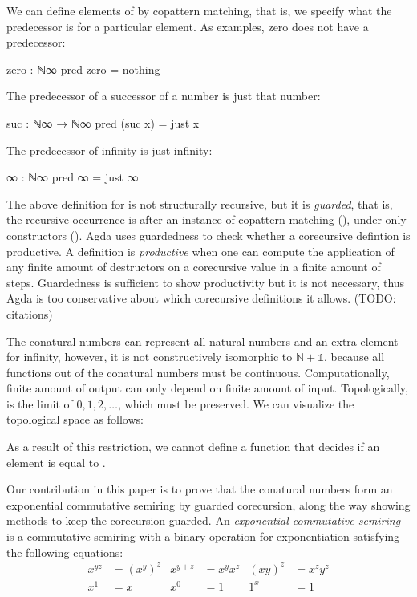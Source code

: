 We can define elements of  by copattern matching, that is, we
specify what the predecessor is for a particular element. As examples, zero does
not have a predecessor:
\begin{code}
zero : ℕ∞
pred zero = nothing
\end{code}
The predecessor of a successor of a number is just that number:
\begin{code}
suc : ℕ∞ → ℕ∞
pred (suc x) = just x
\end{code}
The predecessor of infinity is just infinity:
\begin{code}
∞ : ℕ∞
pred ∞ = just ∞
\end{code}
The above definition for  is not structurally recursive, but it
is \emph{guarded}, that is, the recursive occurrence is after an instance of
copattern matching (), under only constructors
(). Agda uses guardedness to check whether a
corecursive defintion is productive. A definition is \emph{productive} when one
can compute the application of any finite amount of destructors on a corecursive
value in a finite amount of steps. Guardedness is sufficient to show
productivity but it is not necessary, thus Agda is too conservative about which
corecursive definitions it allows. (TODO: citations)

The conatural numbers can represent all natural numbers and an extra element for
infinity, however, it is not constructively isomorphic to $\mathbb{N} +
\mathbb{1}$, because all functions out of the conatural numbers must be
continuous. Computationally, finite amount of output can only depend on finite
amount of input. Topologically,  is the limit of $0, 1, 2,
\dots$, which must be preserved. We can visualize the topological space as
follows:
\begin{center}
\end{center}
As a result of this restriction, we cannot define a function that decides if an
element is equal to .

Our contribution in this paper is to prove that the conatural numbers form an
exponential commutative semiring by guarded corecursion, along the way showing
methods to keep the corecursion guarded. An \emph{exponential commutative
semiring} is a commutative semiring with a binary operation for exponentiation
satisfying the following equations:
\begin{align*}
  x^{yz} &= (x^y)^z & x^{y+z} &= x^y x^z & (xy)^z &= x^z y^z \\
  x^1 &= x & x^0 &= 1 & 1^x &= 1
\end{align*}


